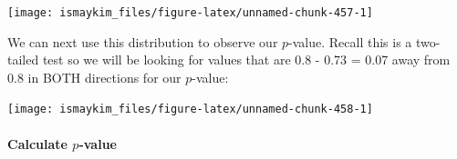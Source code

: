 \documentclass[12pt, krantz2,]{krantz}
\makeatletter
\newenvironment{Shaded}{\begin{snugshade}}{\end{snugshade}}
\newcommand{\DataTypeTok}[1]{\textcolor[rgb]{0.27,0.27,0.27}{#1}}
\newcommand{\DecValTok}[1]{\textcolor[rgb]{0.06,0.06,0.06}{#1}}
\newcommand{\FloatTok}[1]{\textcolor[rgb]{0.06,0.06,0.06}{#1}}
\newcommand{\KeywordTok}[1]{\textcolor[rgb]{0.27,0.27,0.27}{\textbf{#1}}}
\newcommand{\NormalTok}[1]{#1}
\newcommand{\OperatorTok}[1]{\textcolor[rgb]{0.43,0.43,0.43}{\textbf{#1}}}
\newcommand{\StringTok}[1]{\textcolor[rgb]{0.5,0.5,0.5}{#1}}
\let\oldparagraph\paragraph
\renewcommand{\paragraph}[1]{\oldparagraph{#1}\mbox{}}
\newenvironment{kframe}{%
\medskip{}
\setlength{\fboxsep}{.8em}
 \def\at@end@of@kframe{}%
 \ifinner\ifhmode%
  \def\at@end@of@kframe{\end{minipage}}%
  \begin{minipage}{\columnwidth}%
 \fi\fi%
 \def\FrameCommand##1{\hskip\@totalleftmargin \hskip-\fboxsep
 \colorbox{shadecolor}{##1}\hskip-\fboxsep
     \hskip-\linewidth \hskip-\@totalleftmargin \hskip\columnwidth}%
 \MakeFramed {\advance\hsize-\width
   \@totalleftmargin\z@ \linewidth\hsize
   \@setminipage}}%
 {\par\unskip\endMakeFramed%
 \at@end@of@kframe}
\renewenvironment{Shaded}{\begin{kframe}}{\end{kframe}}
\makeatother
\begin{document}
\begin{Shaded}
\end{Shaded}

\begin{Shaded}
\end{Shaded}

\begin{center}\texttt{[image: ismaykim\_files/figure-latex/unnamed-chunk-457-1]} \end{center}

We can next use this distribution to observe our \(p\)-value. Recall this is a two-tailed test so we will be looking for values that are 0.8 - 0.73 = 0.07 away from 0.8 in BOTH directions for our \(p\)-value:

\begin{Shaded}
\end{Shaded}

\begin{center}\texttt{[image: ismaykim\_files/figure-latex/unnamed-chunk-458-1]} \end{center}

\hypertarget{calculate-p-value-1}{%
\paragraph{\texorpdfstring{Calculate \(p\)-value}{Calculate p-value}}\label{calculate-p-value-1}}
\end{document}
